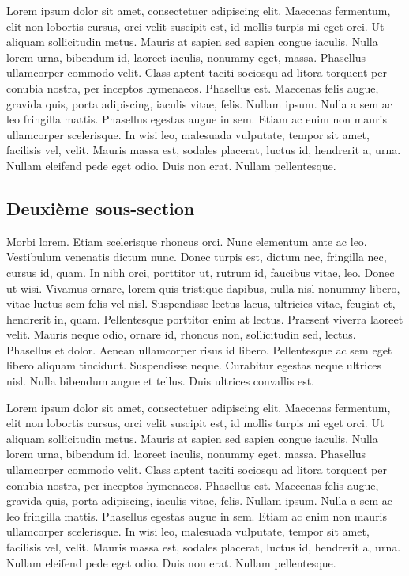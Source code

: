Lorem ipsum dolor sit amet, consectetuer adipiscing elit. Maecenas
fermentum, elit non lobortis cursus, orci velit suscipit est, id mollis
turpis mi eget orci. Ut aliquam sollicitudin metus. Mauris at sapien sed
sapien congue iaculis. Nulla lorem urna, bibendum id, laoreet iaculis,
nonummy eget, massa. Phasellus ullamcorper commodo velit. Class aptent
taciti sociosqu ad litora torquent per conubia nostra, per inceptos
hymenaeos. Phasellus est. Maecenas felis augue, gravida quis, porta
adipiscing, iaculis vitae, felis. Nullam ipsum. Nulla a sem ac leo
fringilla mattis. Phasellus egestas augue in sem. Etiam ac enim non
mauris ullamcorper scelerisque. In wisi leo, malesuada vulputate, tempor
sit amet, facilisis vel, velit. Mauris massa est, sodales placerat,
luctus id, hendrerit a, urna. Nullam eleifend pede eget odio. Duis non
erat. Nullam pellentesque.

\hypertarget{deuxiuxe8me-sous-section}{%
\subsection{Deuxième sous-section}\label{deuxiuxe8me-sous-section}}

Morbi lorem. Etiam scelerisque rhoncus orci. Nunc elementum ante ac leo.
Vestibulum venenatis dictum nunc. Donec turpis est, dictum nec,
fringilla nec, cursus id, quam. In nibh orci, porttitor ut, rutrum id,
faucibus vitae, leo. Donec ut wisi. Vivamus ornare, lorem quis tristique
dapibus, nulla nisl nonummy libero, vitae luctus sem felis vel nisl.
Suspendisse lectus lacus, ultricies vitae, feugiat et, hendrerit in,
quam. Pellentesque porttitor enim at lectus. Praesent viverra laoreet
velit. Mauris neque odio, ornare id, rhoncus non, sollicitudin sed,
lectus. Phasellus et dolor. Aenean ullamcorper risus id libero.
Pellentesque ac sem eget libero aliquam tincidunt. Suspendisse neque.
Curabitur egestas neque ultrices nisl. Nulla bibendum augue et tellus.
Duis ultrices convallis est.

Lorem ipsum dolor sit amet, consectetuer adipiscing elit. Maecenas
fermentum, elit non lobortis cursus, orci velit suscipit est, id mollis
turpis mi eget orci. Ut aliquam sollicitudin metus. Mauris at sapien sed
sapien congue iaculis. Nulla lorem urna, bibendum id, laoreet iaculis,
nonummy eget, massa. Phasellus ullamcorper commodo velit. Class aptent
taciti sociosqu ad litora torquent per conubia nostra, per inceptos
hymenaeos. Phasellus est. Maecenas felis augue, gravida quis, porta
adipiscing, iaculis vitae, felis. Nullam ipsum. Nulla a sem ac leo
fringilla mattis. Phasellus egestas augue in sem. Etiam ac enim non
mauris ullamcorper scelerisque. In wisi leo, malesuada vulputate, tempor
sit amet, facilisis vel, velit. Mauris massa est, sodales placerat,
luctus id, hendrerit a, urna. Nullam eleifend pede eget odio. Duis non
erat. Nullam pellentesque.

